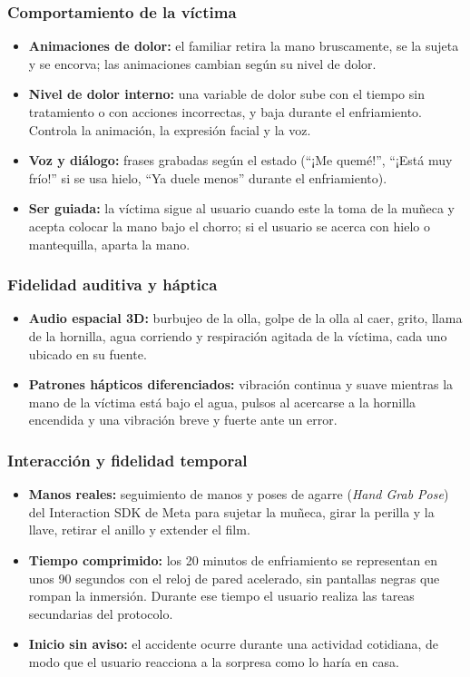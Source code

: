\documentclass[11pt,letterpaper]{article}
\begin{document}
\subsubsection{Comportamiento de la víctima}
\begin{itemize}
  \item \textbf{Animaciones de dolor:} el familiar retira la mano bruscamente, se la sujeta y se encorva; las animaciones cambian según su nivel de dolor.
  \item \textbf{Nivel de dolor interno:} una variable de dolor sube con el tiempo sin tratamiento o con acciones incorrectas, y baja durante el enfriamiento. Controla la animación, la expresión facial y la voz.
  \item \textbf{Voz y diálogo:} frases grabadas según el estado (``¡Me quemé!'', ``¡Está muy frío!'' si se usa hielo, ``Ya duele menos'' durante el enfriamiento).
  \item \textbf{Ser guiada:} la víctima sigue al usuario cuando este la toma de la muñeca y acepta colocar la mano bajo el chorro; si el usuario se acerca con hielo o mantequilla, aparta la mano.
\end{itemize}

\subsubsection{Fidelidad auditiva y háptica}
\begin{itemize}
  \item \textbf{Audio espacial 3D:} burbujeo de la olla, golpe de la olla al caer, grito, llama de la hornilla, agua corriendo y respiración agitada de la víctima, cada uno ubicado en su fuente.
  \item \textbf{Patrones hápticos diferenciados:} vibración continua y suave mientras la mano de la víctima está bajo el agua, pulsos al acercarse a la hornilla encendida y una vibración breve y fuerte ante un error.
\end{itemize}

\subsubsection{Interacción y fidelidad temporal}
\begin{itemize}
  \item \textbf{Manos reales:} seguimiento de manos y poses de agarre (\textit{Hand Grab Pose}) del Interaction SDK de Meta para sujetar la muñeca, girar la perilla y la llave, retirar el anillo y extender el film.
  \item \textbf{Tiempo comprimido:} los 20 minutos de enfriamiento se representan en unos 90 segundos con el reloj de pared acelerado, sin pantallas negras que rompan la inmersión. Durante ese tiempo el usuario realiza las tareas secundarias del protocolo.
  \item \textbf{Inicio sin aviso:} el accidente ocurre durante una actividad cotidiana, de modo que el usuario reacciona a la sorpresa como lo haría en casa.
\end{itemize}
\end{document}
